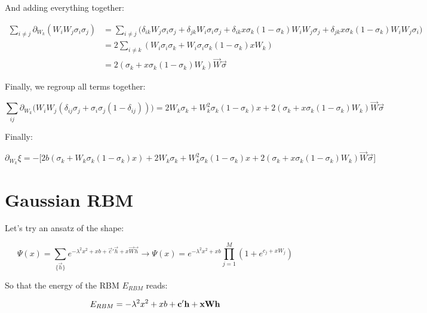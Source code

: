 \documentclass{book}
\begin{document}
And adding everything together:

\begin{align*}
    \sum_{i\neq j}\partial_{W_k}(W_iW_j\sigma_i\sigma_j)&=\sum_{i\neq j}\bigg(\delta_{ik}W_j\sigma_i\sigma_j+\delta_{jk}W_i\sigma_i\sigma_j+\delta_{ik}x\sigma_k(1-\sigma_k)W_iW_j\sigma_j+\delta_{jk}x\sigma_k(1-\sigma_k)W_iW_j\sigma_i\bigg)\\&=2\sum_{i\neq k}(W_i\sigma_i\sigma_k+W_i\sigma_i\sigma_k(1-\sigma_k)xW_k)\\&=2(\sigma_k+x\sigma_k(1-\sigma_k)W_k)\vec{W}\vec{\sigma}
\end{align*}

Finally, we regroup all terms together:

\[\sum_{ij}\partial_{W_k}\bigg(W_iW_j(\delta_{ij}\sigma_j+\sigma_i\sigma_j(1-\delta_{ij}))\bigg)=2W_k\sigma_k+W_k^2\sigma_k(1-\sigma_k)x+2(\sigma_k+x\sigma_k(1-\sigma_k)W_k)\vec{W}\vec{\sigma}\]

Finally:

\[\partial_{W_k}\xi=-\bigg[2b(\sigma_k+W_k\sigma_k(1-\sigma_k)x)+2W_k\sigma_k+W_k^2\sigma_k(1-\sigma_k)x+2(\sigma_k+x\sigma_k(1-\sigma_k)W_k)\vec{W}\vec{\sigma}\bigg]\]

\section{Gaussian RBM}

Let's try an ansatz of the shape:

\[\Psi(x)=\sum_{\{\vec{h}\}}e^{-\lambda^2x^2+xb+\vec{c}'\vec{h}+x\vec{W}\vec{h}}\to\Psi(x)=e^{-\lambda^2x^2+xb}\prod_{j=1}^M(1+e^{c_j+xW_j})\]

So that the energy of the RBM $E_{RBM}$ reads:

\[E_{RBM}=-\lambda^2x^2+xb+\bf{c}'\bf{h}+x\bf{W}\bf{h}\]
\end{document}
